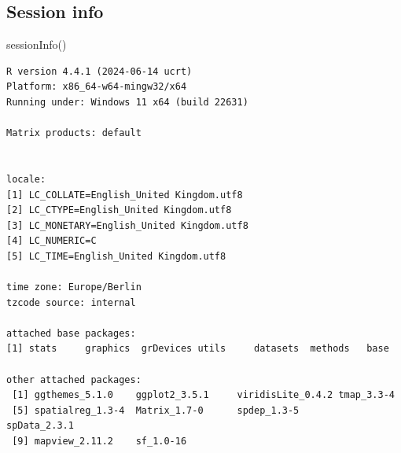 \documentclass[
  letterpaper,
  DIV=11,
  numbers=noendperiod]{scrreprt}
\newenvironment{Shaded}{\begin{snugshade}}{\end{snugshade}}
\newcommand{\FunctionTok}[1]{\textcolor[rgb]{0.28,0.35,0.67}{#1}}
\newcommand{\NormalTok}[1]{\textcolor[rgb]{0.00,0.23,0.31}{#1}}
\begin{document}
\hypertarget{session-info-3}{%
\subsection*{Session info}\label{session-info-3}}

\begin{Shaded}
\begin{Highlighting}[]
\FunctionTok{sessionInfo}\NormalTok{()}
\end{Highlighting}
\end{Shaded}

\begin{verbatim}
R version 4.4.1 (2024-06-14 ucrt)
Platform: x86_64-w64-mingw32/x64
Running under: Windows 11 x64 (build 22631)

Matrix products: default


locale:
[1] LC_COLLATE=English_United Kingdom.utf8 
[2] LC_CTYPE=English_United Kingdom.utf8   
[3] LC_MONETARY=English_United Kingdom.utf8
[4] LC_NUMERIC=C                           
[5] LC_TIME=English_United Kingdom.utf8    

time zone: Europe/Berlin
tzcode source: internal

attached base packages:
[1] stats     graphics  grDevices utils     datasets  methods   base     

other attached packages:
 [1] ggthemes_5.1.0    ggplot2_3.5.1     viridisLite_0.4.2 tmap_3.3-4       
 [5] spatialreg_1.3-4  Matrix_1.7-0      spdep_1.3-5       spData_2.3.1     
 [9] mapview_2.11.2    sf_1.0-16        


\end{verbatim}
\end{document}
